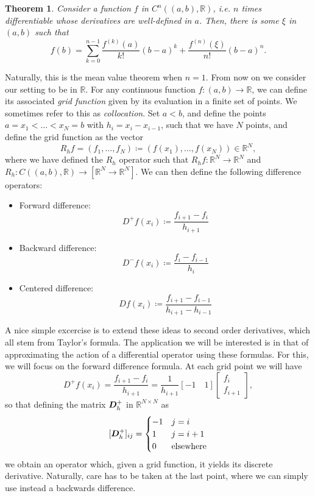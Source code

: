 \documentclass{article}
\newcommand{\mat}{\matrixsym}
\newcommand{\R}{\mathbb{R}}
\newtheorem{theorem}{Theorem}
\begin{document}
\begin{theorem}\label{thm:taylor}
    Consider a function $f$ in $C^n((a,b), \R)$, i.e. $n$ times differentiable whose derivatives are well-defined in $a$. Then, there is some $\xi$ in $(a,b)$ such that
    $$ f(b) = \sum_{k=0}^{n-1}\frac{f^{(k)}(a)}{k!}(b-a)^k + \frac{f^{(n)}(\xi)}{n!}(b-a)^n. $$
\end{theorem}
Naturally, this is the mean value theorem when $n=1$. From now on we consider our setting to be in $\R$. For any continuous function $f:(a,b)\to \R$, we can define its associated \emph{grid function} given by its evaluation in a finite set of points. We sometimes refer to this as \emph{collocation}. Set $a<b$, and define the points $a=x_1<\hdots<x_N=b$ with $h_i=x_{i}-x_{i-1}$, such that we have $N$ points, and define the grid function as the vector
    $$ R_hf = (f_1, \hdots, f_N) \coloneqq (f(x_1), \hdots, f(x_N)) \in \R^N,$$
    where we have defined the $R_h$ operator such that $R_hf:\R^N \to \R^N$ and $R_h:C((a,b),\R)\to [\R^N\to\R^N]$.  We can then define the following difference operators: 
    \begin{itemize}
        \item Forward difference: 
            $$ D^+f(x_i) \coloneqq \frac{f_{i+1} - f_i}{h_{i+1}} $$
        \item Backward difference: 
            $$ D^-f(x_i) \coloneqq \frac{f_{i} - f_{i-1}}{h_{i}} $$
        \item Centered difference:
            $$ Df(x_i) \coloneqq \frac{f_{i+1} - f_{i-1}}{h_{i+1} - h_{i-1}} $$

    \end{itemize}
A nice simple excercise is to extend these ideas to second order derivatives, which all stem from Taylor's formula. The application we will be interested is in that of approximating the action of a differential operator using these formulas. For this, we will focus on the forward difference formula. At each grid point we will have
$$ D^+f(x_i) = \frac{f_{i+1} - f_i}{h_{i+1}} = \frac 1{h_{i+1}} [-1\quad 1]\begin{bmatrix}f_i \\ f_{i+1}\end{bmatrix}, $$
so that defining the matrix $\mat D_h^+$ in $\R^{N\times N}$ as
$$ [\mat D_h^+]_{ij} = \begin{cases} -1 & j=i \\ 1  & j=i+1 \\ 0 & \text{elsewhere} \end{cases} $$
we obtain an operator which, given a grid function, it yields its discrete derivative. Naturally, care has to be taken at the last point, where we can simply use instead a backwards difference. 
\end{document}
